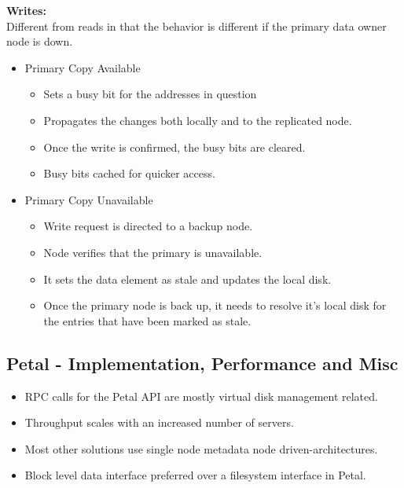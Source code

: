 \documentclass[parskip=half]{scrartcl}
\begin{document}
        \textbf{Writes:}\\
        Different from reads in that the behavior is different if the primary data owner node is down.
        \begin{itemize}
            \item 
            Primary Copy Available
            \begin{itemize}
                \item 
                Sets a busy bit for the addresses in question
                \item 
                Propagates the changes both locally and to the replicated node.
                \item 
                Once the write is confirmed, the busy bits are cleared.
                \item 
                Busy bits cached for quicker access.
            \end{itemize}
            \item 
            Primary Copy Unavailable
            \begin{itemize}
                \item 
                Write request is directed to a backup node.
                \item 
                Node verifies that the primary is unavailable.
                \item 
                It sets the data element as stale and updates the local disk.
                \item 
                Once the primary node is back up, it needs to resolve it's local disk for the entries that have been marked as stale.
            \end{itemize}
        \end{itemize}
    

    \subsection{Petal - Implementation, Performance and Misc} %
    \label{sub:petal_implementation_performance_and_misc}

        \begin{itemize}
            \item 
            RPC calls for the Petal API are mostly virtual disk management related.
            \item 
            Throughput scales with an increased number of servers.
            \item 
            Most other solutions use single node metadata node driven-architectures.
            \item 
            Block level data interface preferred over a filesystem interface in Petal.
        \end{itemize}
    
\end{document}
